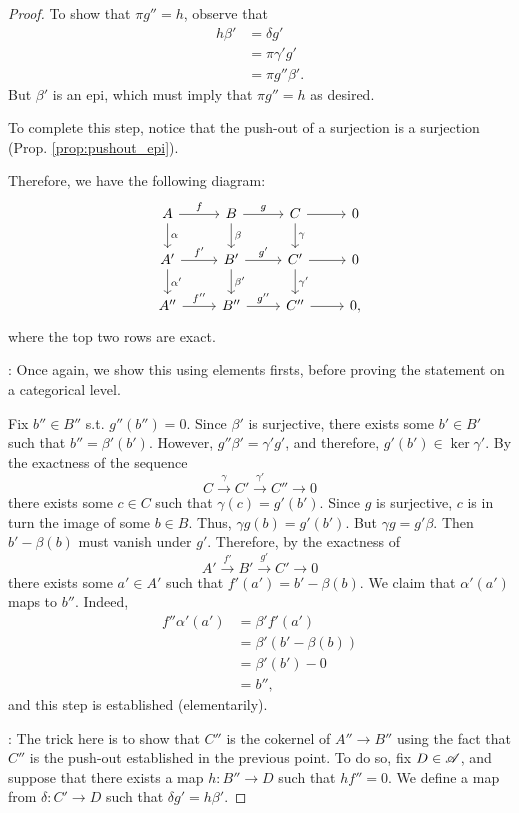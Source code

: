 \begin{proof}
To show that $\pi g'' = h$, observe that
\begin{align*}
h \beta' &= \delta g' \\
         &= \pi \gamma' g' \\
         &= \pi g'' \beta'.
\end{align*}
But $\beta'$ is an epi, which must imply that $\pi g'' = h$ as
desired.

To complete this step, notice that the push-out of a surjection
is a surjection (Prop. \ref{prop:pushout_epi}).

Therefore, we have the following diagram:
\[
\begin{tikzcd}
A \arrow{r}{f} \arrow{d}{\alpha} &
B \arrow{r}{g} \arrow{d}{\beta} &
C \arrow{r} \arrow{d}{\gamma} &
0 \\
A' \arrow{r}{f'} \arrow{d}{\alpha'} &
B' \arrow{r}{g'} \arrow{d}{\beta'} &
C' \arrow{r} \arrow{d}{\gamma'} &
0 \\
A'' \arrow{r}{f''} &
B'' \arrow{r}{g''} &
C'' \arrow{r} &
0,
\end{tikzcd}
\]
where the top two rows are exact.

: Once again, we show this
using elements firsts, before proving the statement on a 
categorical level. 

Fix $b'' \in B''$ s.t. $g''(b'') = 0$. Since $\beta'$ is 
surjective, there exists some $b' \in B'$ such that $b'' = 
\beta'(b')$. However, $g''\beta' = \gamma' g'$, and 
therefore, $g'(b') \in \ker \gamma'$. By the exactness of
the sequence
\[
C \stackrel{\gamma}{\to} C' \stackrel{\gamma'}{\to} C'' \to 0
\]
there exists some $c \in C$ such that $\gamma(c) = g'(b')$.
Since $g$ is surjective, $c$ is in turn the image of some $b
\in B$. Thus, $\gamma g(b) = g'(b')$. But $\gamma g = g' \beta$.
Then $b' - \beta(b)$ must vanish under $g'$. Therefore, by the 
exactness of 
\[
A' \stackrel{f'}{\to} B' \stackrel{g'}{\to} C' \to 0
\]
there exists some $a' \in A'$ such that $f'(a') = b' - \beta(b)$.
We claim that $\alpha'(a')$ maps to $b''$. Indeed,
\begin{align*}
f'' \alpha'(a') &= \beta' f'(a') \\
                &= \beta'(b' - \beta(b)) \\
                &= \beta'(b') - 0 \\
                &= b'',
\end{align*}
and this step is established (elementarily).

: The trick here 
is to show that $C''$ is the cokernel of $A'' \to B''$ using the
fact that $C''$ is the push-out established in the previous point.
To do so, fix $D \in \mathscr{A}$, and suppose that there exists a 
map $h: B'' \to D$ such that $h f'' = 0$. We define a map from 
$\delta: C' \to D$ such that $\delta g' = h \beta'$.


\end{proof}

